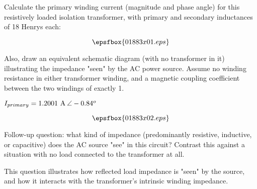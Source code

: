 

Calculate the primary winding current (magnitude and phase angle) for this resistively loaded isolation transformer, with primary and secondary inductances of 18 Henrys each:

$$\epsfbox{01883x01.eps}$$

Also, draw an equivalent schematic diagram (with no transformer in it) illustrating the impedance "seen" by the AC power source.  Assume no winding resistance in either transformer winding, and a magnetic coupling coefficient between the two windings of exactly 1.







$I_{primary} = 1.2001 \hbox{ A} \> \angle -0.84^o$

$$\epsfbox{01883x02.eps}$$

\vskip 10pt

Follow-up question: what kind of impedance (predominantly resistive, inductive, or capacitive) does the AC source "see" in this circuit?  Contrast this against a situation with no load connected to the transformer at all.







This question illustrates how reflected load impedance is "seen" by the source, and how it interacts with the transformer's intrinsic winding impedance.




